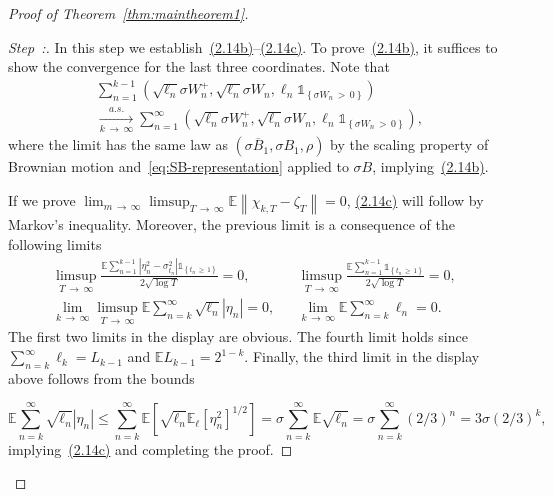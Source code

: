 \documentclass[AHL,Unicode,longabstracts,published]{cedram}
\newcommand\E{\mathds{E}}
\newcommand\1{\mathds{1}}
\newcommand\ov[1]{\overline{#1}}
\newcounter{stepcount}
\newenvironment{step}{\refstepcounter{stepcount}\begin{proof}[Step~\thestepcount:]}{\let\qed\relax\end{proof}}
\begin{document}
\begin{proof}[Proof of Theorem~\ref{thm:maintheorem1}]
\begin{step}\label{proof-theo1.1-step3}
In this step we establish~\hyperref[eq:quintuple-Billingsley]{(2.14b)}--\hyperref[eq:quintuple-Billingsley]{(2.14c)}. To prove~\hyperref[eq:quintuple-Billingsley]{(2.14b)}, it suffices to show the convergence for the last three coordinates. Note that
\begin{multline*}
\sum_{n=1}^{k-1}\left(\sqrt{\ell_n}\sigma W_n^+, \sqrt{\ell_n}\sigma W_n, \ell_n\1_{\left\{\sigma W_n\,>\,0\right\}}\right)\\
\xrightarrow[k\,\to\,\infty]{a.s.}
\sum_{n=1}^\infty\left(\sqrt{\ell_n}\sigma W_n^+, \sqrt{\ell_n}\sigma W_n, \ell_n\1_{\left\{\sigma W_n\,>\,0\right\}}\right),
\end{multline*}
where the limit has the same law as $(\sigma \ov B_1,\sigma B_1,\rho)$ by the scaling property of Brownian motion and~\eqref{eq:SB-representation} applied to $\sigma B$, implying~\hyperref[eq:quintuple-Billingsley]{(2.14b)}.

If we prove $\lim_{m\,\to\,\infty}\limsup_{T\,\to\,\infty} \E\left\|\chi_{k,T}-\zeta_T\right\|=0$, \hyperref[eq:quintuple-Billingsley]{(2.14c)} will follow by Markov's inequality. Moreover, the previous limit is a consequence of the following limits
\begin{align*}
\limsup_{T\,\to\,\infty}\frac{\E\sum\limits_{n=1}^{k-1}\left|\eta_n^2-\sigma_{t_n}^2\right|\1_{\left\{t_n\,\ge\,1\right\}}}{2\sqrt{\log T}} =0,&&
\limsup_{T\,\to\,\infty}\frac{\E\sum\limits_{n=1}^{k-1} \1_{\left\{t_n\,\ge\,1\right\}}}{2\sqrt{\log T}} =0,&\\
\lim_{k\,\to\,\infty}\limsup_{T\,\to\,\infty}\E\sum_{n=k}^\infty\sqrt{\ell_n}\left|\eta_n\right| =0,&&
\lim_{k\,\to\,\infty}\E\sum_{n=k}^\infty\ell_n =0.&
\end{align*}
The first two limits in the display are obvious. The fourth limit holds since $\sum_{n=k}^\infty\ell_k=L_{k-1}$ and $\E L_{k-1}=2^{1-k}$. Finally, the third limit in the display above follows from the bounds

\[
\E\sum_{n=k}^\infty\sqrt{\ell_n}|\eta_n|
\le\sum_{n=k}^\infty\E\left[\sqrt{\ell_n}\E_\ell\left[\eta_n^2\right]^{1/2}\right] =\sigma\sum_{n=k}^\infty\E\sqrt{\ell_n} =\sigma\sum_{n=k}^\infty(2/3)^n =3\sigma (2/3)^{k},
\]
implying~\hyperref[eq:quintuple-Billingsley]{(2.14c)} and completing the proof.
\end{step}
\end{proof}
\end{document}
